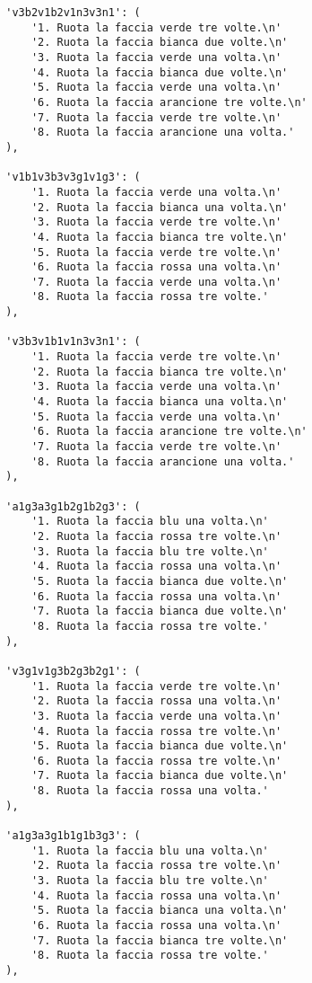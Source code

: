 \begin{lstlisting}
        'v3b2v1b2v1n3v3n1': (
            '1. Ruota la faccia verde tre volte.\n'
            '2. Ruota la faccia bianca due volte.\n'
            '3. Ruota la faccia verde una volta.\n'
            '4. Ruota la faccia bianca due volte.\n'
            '5. Ruota la faccia verde una volta.\n'
            '6. Ruota la faccia arancione tre volte.\n'
            '7. Ruota la faccia verde tre volte.\n'
            '8. Ruota la faccia arancione una volta.'
        ),

        'v1b1v3b3v3g1v1g3': (
            '1. Ruota la faccia verde una volta.\n'
            '2. Ruota la faccia bianca una volta.\n'
            '3. Ruota la faccia verde tre volte.\n'
            '4. Ruota la faccia bianca tre volte.\n'
            '5. Ruota la faccia verde tre volte.\n'
            '6. Ruota la faccia rossa una volta.\n'
            '7. Ruota la faccia verde una volta.\n'
            '8. Ruota la faccia rossa tre volte.'
        ),

        'v3b3v1b1v1n3v3n1': (
            '1. Ruota la faccia verde tre volte.\n'
            '2. Ruota la faccia bianca tre volte.\n'
            '3. Ruota la faccia verde una volta.\n'
            '4. Ruota la faccia bianca una volta.\n'
            '5. Ruota la faccia verde una volta.\n'
            '6. Ruota la faccia arancione tre volte.\n'
            '7. Ruota la faccia verde tre volte.\n'
            '8. Ruota la faccia arancione una volta.'
        ),

        'a1g3a3g1b2g1b2g3': (
            '1. Ruota la faccia blu una volta.\n'
            '2. Ruota la faccia rossa tre volte.\n'
            '3. Ruota la faccia blu tre volte.\n'
            '4. Ruota la faccia rossa una volta.\n'
            '5. Ruota la faccia bianca due volte.\n'
            '6. Ruota la faccia rossa una volta.\n'
            '7. Ruota la faccia bianca due volte.\n'
            '8. Ruota la faccia rossa tre volte.'
        ),

        'v3g1v1g3b2g3b2g1': (
            '1. Ruota la faccia verde tre volte.\n'
            '2. Ruota la faccia rossa una volta.\n'
            '3. Ruota la faccia verde una volta.\n'
            '4. Ruota la faccia rossa tre volte.\n'
            '5. Ruota la faccia bianca due volte.\n'
            '6. Ruota la faccia rossa tre volte.\n'
            '7. Ruota la faccia bianca due volte.\n'
            '8. Ruota la faccia rossa una volta.'
        ),

        'a1g3a3g1b1g1b3g3': (
            '1. Ruota la faccia blu una volta.\n'
            '2. Ruota la faccia rossa tre volte.\n'
            '3. Ruota la faccia blu tre volte.\n'
            '4. Ruota la faccia rossa una volta.\n'
            '5. Ruota la faccia bianca una volta.\n'
            '6. Ruota la faccia rossa una volta.\n'
            '7. Ruota la faccia bianca tre volte.\n'
            '8. Ruota la faccia rossa tre volte.'
        ),


\end{lstlisting}
